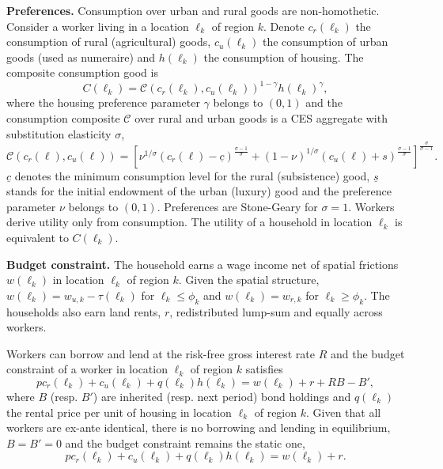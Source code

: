 \documentclass[11pt]{report}
\begin{document}
\textbf{Preferences.} Consumption over urban and rural goods are non-homothetic. Consider a worker living in a location $\ell_k$ of region $k$. Denote $c_r(\ell_k)$ the consumption of rural (agricultural) goods, $c_u(\ell_k)$ the consumption of urban goods (used as numeraire) and $h(\ell_k)$ the consumption of
housing. The composite consumption good is
\begin{equation}
	C(\ell_k)=\mathcal{C}\left(c_{r}(\ell_k), c_{u}(\ell_k) \right)^{1-\gamma}h(\ell_k)^\gamma, \label{eq:C}
\end{equation}
where the housing preference parameter $\gamma$ belongs to $(0,1)$ and the consumption composite $\mathcal{C}$ over rural and urban goods is a CES aggregate with substitution elasticity $\sigma$,
\begin{equation*}
	\mathcal{C}\left(c_{r}(\ell), c_{u}(\ell)\right) =\left[\nu^{1/\sigma}\left(c_{r}(\ell)-\underline{c}\right)^{\frac{\sigma-1}{\sigma}}+(1-\nu)^{1/\sigma}\left(c_{u}(\ell)+s\right)^{\frac{\sigma-1}{\sigma}}\right]^{\frac{\sigma}{\sigma-1}}.
\end{equation*}
$\underline{c}$ denotes the minimum consumption level for the rural (subsistence) good, $\underline{s}$ stands for the initial endowment of the urban (luxury) good and the preference parameter $\nu$ belongs to $(0,1)$. Preferences are Stone-Geary for $\sigma=1$. Workers derive utility only from consumption. The utility of a household in location $\ell_k$ is equivalent to $C(\ell_k)$.%


\textbf{Budget constraint.} The household earns a wage income net of spatial frictions  $w(\ell_k)$ in location $\ell_k$ of region $k$. Given the spatial structure, $w(\ell_k)=w_{u,k} - \tau(\ell_k)$ for $\ell_k \leq \phi_k$ and $w(\ell_k)=w_{r,k}$ for $\ell_k \geq \phi_k$. The households also earn land rents, $r$, redistributed lump-sum and equally across workers. 

Workers can borrow and lend at the risk-free gross interest rate $R$ and the budget constraint of a worker in location $\ell_k$ of region $k$ satisfies%
\begin{equation}
pc_r(\ell_k)+c_u(\ell_k)+q(\ell_k)h(\ell_k)=w(\ell_k)+r+R B-B',  \label{B-eq:BC-dynamic}
\end{equation}%
where $B$ (resp. $B'$) are inherited (resp. next period) bond holdings and $q(\ell_k)$ the rental price per unit of housing in location $\ell_k$ of region $k$. Given that all workers are ex-ante identical, there is no borrowing and lending in equilibrium, $B=B'=0$ and the budget constraint remains the static one,
\begin{equation*}
pc_r(\ell_k)+c_u(\ell_k)+q(\ell_k)h(\ell_k)=w(\ell_k)+r.  \label{B-eq:BC-k2}
\end{equation*}%
\end{document}
